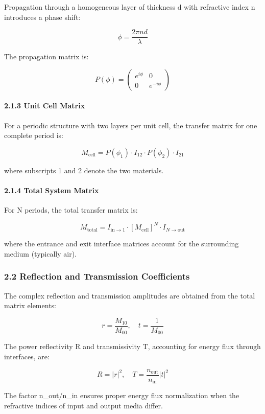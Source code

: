 \documentclass[
]{article}
\begin{document}
Propagation through a homogeneous layer of thickness d with refractive
index n introduces a phase shift:

\[\phi = \frac{2\pi nd}{\lambda}\]

The propagation matrix is:

\[P(\phi) = \begin{pmatrix} e^{i\phi} & 0 \\ 0 & e^{-i\phi} \end{pmatrix}\]

\paragraph{2.1.3 Unit Cell Matrix}\label{unit-cell-matrix}

For a periodic structure with two layers per unit cell, the transfer
matrix for one complete period is:

\[M_{\text{cell}} = P(\phi_1) \cdot I_{12} \cdot P(\phi_2) \cdot I_{21}\]

where subscripts 1 and 2 denote the two materials.

\paragraph{2.1.4 Total System Matrix}\label{total-system-matrix}

For N periods, the total transfer matrix is:

\[M_{\text{total}} = I_{\text{in}\to 1} \cdot [M_{\text{cell}}]^N \cdot I_{N\to\text{out}}\]

where the entrance and exit interface matrices account for the
surrounding medium (typically air).

\subsubsection{2.2 Reflection and Transmission
Coefficients}\label{reflection-and-transmission-coefficients}

The complex reflection and transmission amplitudes are obtained from the
total matrix elements:

\[r = \frac{M_{10}}{M_{00}}, \quad t = \frac{1}{M_{00}}\]

The power reflectivity R and transmissivity T, accounting for energy
flux through interfaces, are:

\[R = |r|^2, \quad T = \frac{n_{\text{out}}}{n_{\text{in}}}|t|^2\]

The factor n\_out/n\_in ensures proper energy flux normalization when
the refractive indices of input and output media differ.
\end{document}
